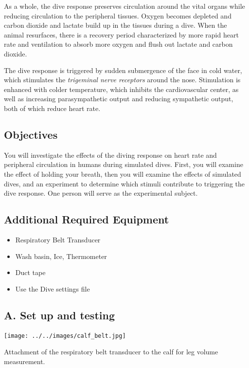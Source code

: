 \documentclass[
  letterpaper,
  DIV=11,
  numbers=noendperiod,
  oneside]{scrartcl}
\providecommand{\tightlist}{%
  \setlength{\itemsep}{0pt}\setlength{\parskip}{0pt}}\usepackage{longtable,booktabs,array}
\begin{document}
As a whole, the dive response preserves circulation around the vital
organs while reducing circulation to the peripheral tissues. Oxygen
becomes depleted and carbon dioxide and lactate build up in the tissues
during a dive. When the animal resurfaces, there is a recovery period
characterized by more rapid heart rate and ventilation to absorb more
oxygen and flush out lactate and carbon dioxide.

The dive response is triggered by sudden submergence of the face in cold
water, which stimulates the \emph{trigeminal nerve receptors} around the
nose. Stimulation is enhanced with colder temperature, which inhibits
the cardiovascular center, as well as increasing parasympathetic output
and reducing sympathetic output, both of which reduce heart rate.

\hypertarget{objectives-1}{%
\subsection{Objectives}\label{objectives-1}}

You will investigate the effects of the diving response on heart rate
and peripheral circulation in humans during simulated dives. First, you
will examine the effect of holding your breath, then you will examine
the effects of simulated dives, and an experiment to determine which
stimuli contribute to triggering the dive response. One person will
serve as the experimental subject.

\hypertarget{additional-required-equipment}{%
\subsection{Additional Required
Equipment}\label{additional-required-equipment}}

\begin{itemize}
\tightlist
\item
  Respiratory Belt Transducer
\item
  Wash basin, Ice, Thermometer
\item
  Duct tape
\item
  Use the Dive settings file
\end{itemize}

\hypertarget{sec-divesetup}{%
\subsection{A. Set up and testing}\label{sec-divesetup}}

\begin{marginfigure}

{\centering \texttt{[image: ../../images/calf\_belt.jpg]}

}

\caption{\label{fig-calf}Attachment of the respiratory belt transducer
to the calf for leg volume measurement.}

\end{marginfigure}
\end{document}
